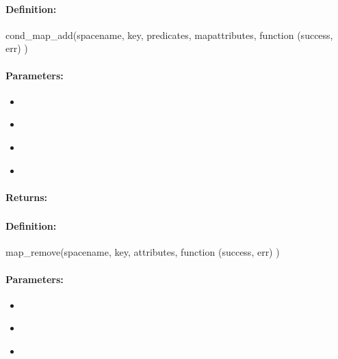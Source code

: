 \paragraph{Definition:}
\begin{javascriptcode}
cond_map_add(spacename, key, predicates, mapattributes, function (success, err) {})
\end{javascriptcode}
\paragraph{Parameters:}
\begin{itemize}[noitemsep]
\item {}\\

\item {}\\

\item {}\\

\item {}\\

\end{itemize}

\paragraph{Returns:}


\pagebreak
\subsubsection{}
\label{api:nodejs:map_remove}


\paragraph{Definition:}
\begin{javascriptcode}
map_remove(spacename, key, attributes, function (success, err) {})
\end{javascriptcode}
\paragraph{Parameters:}
\begin{itemize}[noitemsep]
\item {}\\

\item {}\\

\item {}\\

\end{itemize}

